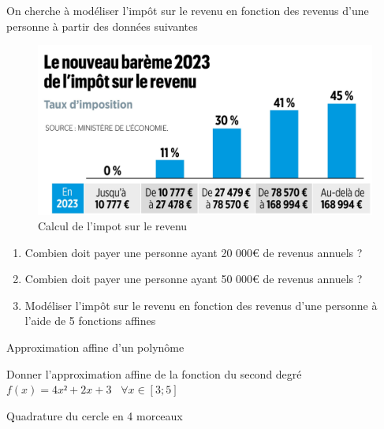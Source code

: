 \documentclass[a4paper]{article}
\begin{document}
On cherche à modéliser l’impôt sur le revenu en fonction des revenus d’une personne à partir des données suivantes 
\begin{figure}[!h]
    \centering
    \includegraphics[width=0.5\linewidth]{impot.jpg}
    \caption{Calcul de l'impot sur le revenu}
    \label{fig:enter-label}
\end{figure}
\begin{enumerate}
    \item Combien doit payer une personne ayant 20 000€ de revenus annuels ?
    \item Combien doit payer une personne ayant 50 000€ de revenus annuels ?
    \item Modéliser l’impôt sur le revenu en fonction des revenus d’une personne à l’aide de 5 fonctions affines
\end{enumerate}



\vspace{0.5cm}
\exost Approximation affine d'un polynôme

Donner l’approximation affine de la fonction du second degré $f(x)=4x²+2x+3$ \ $\forall x \in [3;5]$

\vspace{0.5cm}
\exost Quadrature du cercle en 4 morceaux
\end{document}
